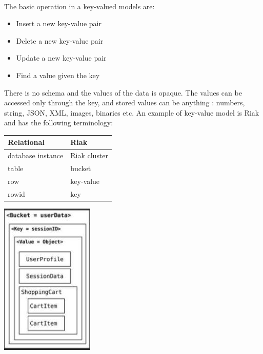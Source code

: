 \documentclass[a4page, 11pt]{article}
\begin{document}
~\\
The basic operation in a key-valued models are:

\begin{itemize}[noitemsep]
	\item
	Insert a new key-value pair
	\item
	Delete a new key-value pair
	\item
	Update a new key-value pair
	\item
	Find a value given the key
\end{itemize}
There is no schema and the values of the data is opaque. The values can be accessed only through the key, and stored values can be anything : numbers, string, JSON, XML, images, binaries etc.
An example of key-value model is Riak and has the following terminology:
\begin{center}
	\begin{minipage}[b]{0.4\textwidth}
	\begin{tabular}{|l|l|}
		\hline
		\textbf{Relational} & \textbf{Riak}\\ \hline
		database instance & Riak cluster\\ \hline
		table & bucket \\ \hline
		row & key-value\\ \hline
		rowid & key\\ \hline
	\end{tabular}
	\end{minipage}
	\begin{minipage}{.5\textwidth}\centering
	\includegraphics[scale=0.6]{IMAGE4.jpg}
	\end{minipage}

\end{center}
\end{document}
